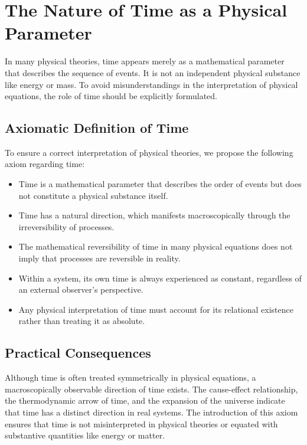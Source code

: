 
\section{The Nature of Time as a Physical Parameter}

In many physical theories, time appears merely as a mathematical parameter that describes the sequence of events. It is not an independent physical substance like energy or mass. To avoid misunderstandings in the interpretation of physical equations, the role of time should be explicitly formulated.

\subsection{Axiomatic Definition of Time}

To ensure a correct interpretation of physical theories, we propose the following axiom regarding time:

\begin{itemize}
    \item Time is a mathematical parameter that describes the order of events but does not constitute a physical substance itself.
    \item Time has a natural direction, which manifests macroscopically through the irreversibility of processes.
    \item The mathematical reversibility of time in many physical equations does not imply that processes are reversible in reality.
    \item Within a system, its own time is always experienced as constant, regardless of an external observer's perspective.
    \item Any physical interpretation of time must account for its relational existence rather than treating it as absolute.
\end{itemize}

\subsection{Practical Consequences}

Although time is often treated symmetrically in physical equations, a macroscopically observable direction of time exists. The cause-effect relationship, the thermodynamic arrow of time, and the expansion of the universe indicate that time has a distinct direction in real systems. The introduction of this axiom ensures that time is not misinterpreted in physical theories or equated with substantive quantities like energy or matter.

